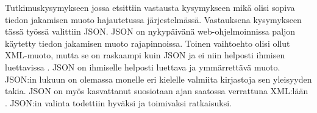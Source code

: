 Tutkimuskysymykseen jossa etsittiin vastausta kysymykseen mikä olisi sopiva tiedon jakamisen muoto hajautetussa järjestelmässä. Vastauksena kysymykseen tässä työssä valittiin JSON. JSON on nykypäivänä web-ohjelmoinnissa paljon käytetty tiedon jakamisen muoto rajapinnoissa. Toinen vaihtoehto olisi ollut XML-muoto, mutta se on raskaampi kuin JSON ja ei niin helposti ihmisen luettavissa \cite[s.~159]{distributed-systems-concepts-and-design}. JSON on ihmiselle helposti luettava ja ymmärrettävä muoto. JSON:in lukuun on olemassa monelle eri kielelle valmiita kirjastoja sen yleisyyden takia. JSON on myös kasvattanut suosiotaan ajan saatossa verrattuna XML:lään \cite{google-trends-xml-json}. JSON:in valinta todettiin hyväksi ja toimivaksi ratkaisuksi. \cite{the-rise-and-rise-of-json, why-json-is-better-than-xml}